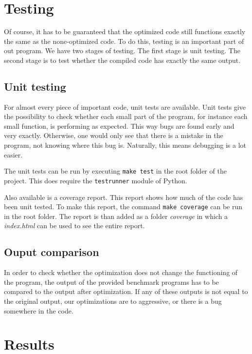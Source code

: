 \documentclass[10pt,a4paper]{article}
\begin{document}
\section{Testing}

Of course, it has to be guaranteed that the optimized code still functions
exactly the same as the none-optimized code. To do this, testing is an
important part of out program. We have two stages of testing. The first stage
is unit testing. The second stage is to test whether the compiled code has
exactly the same output.

\subsection{Unit testing}

For almost every piece of important code, unit tests are available. Unit tests
give the possibility to check whether each small part of the program, for
instance each small function, is performing as expected. This way bugs are
found early and very exactly. Otherwise, one would only see that there is a
mistake in the program, not knowing where this bug is. Naturally, this means
debugging is a lot easier.

The unit tests can be run by executing \texttt{make test} in the root folder of
the project. This does require the \texttt{testrunner} module of Python.

Also available is a coverage report. This report shows how much of the code has
been unit tested. To make this report, the command \texttt{make coverage} can
be run in the root folder. The report is than added as a folder \emph{coverage}
in which a \emph{index.html} can be used to see the entire report.

\subsection{Ouput comparison}

In order to check whether the optimization does not change the functioning of
the program, the output of the provided benchmark programs has to be compared
to the output after optimization. If any of these outputs is not equal to the
original output, our optimizations are to aggressive, or there is a bug
somewhere in the code.

\section{Results}
\end{document}
